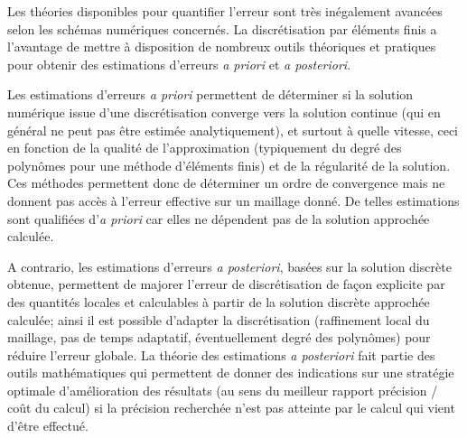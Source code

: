 Les th\'eories disponibles pour quantifier l'erreur sont tr\`es in\'egalement avanc\'ees selon les sch\'emas num\'eriques concern\'es. La discr\'etisation par \'el\'ements finis a l'avantage de mettre \`a disposition de nombreux outils th\'eoriques et pratiques pour obtenir des estimations d'erreurs {\it a priori} et {\it a posteriori}.

 Les estimations d'erreurs {\it a priori} permettent de d\'eterminer si la solution num\'erique issue d'une discr\'etisation converge vers la solution continue (qui en
 g\'en\'eral ne peut pas \^etre estim\'ee analytiquement), et surtout \`a quelle vitesse, ceci en fonction de la qualit\'e de l'approximation (typiquement du degr\'e des
 polyn\^omes pour une m\'ethode d'\'el\'ements finis) et de la r\'egularit\'e de la solution. Ces m\'ethodes permettent donc de d\'eterminer un ordre de convergence mais ne donnent pas acc\`es \`a l'erreur effective sur un maillage donn\'e. De telles estimations sont qualifi\'ees d'{\it a priori} car elles ne d\'ependent pas de la solution approch\'ee calcul\'ee.

A contrario, les estimations d'erreurs {\it a posteriori}, bas\'ees sur la solution discr\`ete obtenue, permettent de majorer l'erreur de discr\'etisation de fa\c con
explicite par des quantit\'es locales et calculables \`a partir de la solution discr\`ete approch\'ee calcul\'ee; ainsi il est possible d'adapter la discr\'etisation
(raffinement local du maillage, pas de temps adaptatif, \'eventuellement degr\'e des polyn\^omes) pour r\'eduire l'erreur globale. 
La th\'eorie des estimations {\it a posteriori} fait partie des outils math\'ematiques qui permettent de donner des indications sur une strat\'egie optimale d'am\'elioration des r\'esultats (au sens du meilleur rapport pr\'ecision / co\^ut du calcul) si la pr\'ecision recherch\'ee n'est pas atteinte par le calcul qui vient d'\^etre effectu\'e. 

